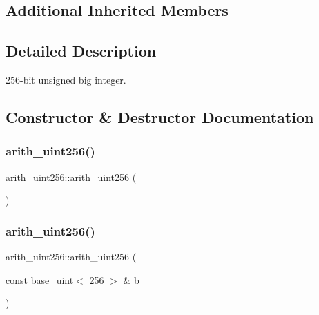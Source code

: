 \subsection*{Additional Inherited Members}


\subsection{Detailed Description}
256-\/bit unsigned big integer. 

\subsection{Constructor \& Destructor Documentation}
\mbox{\label{classarith__uint256_a1dae7481f3ebf5457f70aaf385d566dd}} 
\subsubsection{\texorpdfstring{arith\+\_\+uint256()}{arith\_uint256()}\hspace{0.1cm}{\footnotesize\ttfamily [1/4]}}
{\footnotesize\ttfamily arith\+\_\+uint256\+::arith\+\_\+uint256 (\begin{DoxyParamCaption}{ }\end{DoxyParamCaption})\hspace{0.3cm}{\ttfamily [inline]}}

\mbox{\label{classarith__uint256_a86c126d261e0edeea49e051e2f3b98a7}} 
\subsubsection{\texorpdfstring{arith\+\_\+uint256()}{arith\_uint256()}\hspace{0.1cm}{\footnotesize\ttfamily [2/4]}}
{\footnotesize\ttfamily arith\+\_\+uint256\+::arith\+\_\+uint256 (\begin{DoxyParamCaption}\item[{const \mbox{\hyperlink{classbase__uint}{base\+\_\+uint}}$<$ 256 $>$ \&}]{b }\end{DoxyParamCaption})\hspace{0.3cm}{\ttfamily [inline]}}

